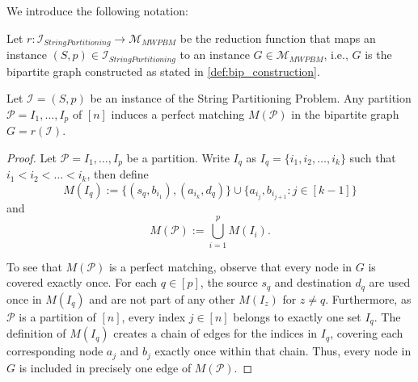 \runsdef*

\stringpartitioningdef*

We introduce the following notation:
\begin{definition}
    Let $r:\mathcal{I}_{String Partitioning} \rightarrow \mathcal{M}_{MWPBM}$ be the reduction function that maps an instance $(S, p)\in \mathcal{I}_{String Partitioning}$ to an instance $G\in\mathcal{M}_{MWPBM}$, i.e., $G$ is the bipartite graph constructed as stated in \cref{def:bip_construction}.
\end{definition}

\begin{lemma} \label{lemma:partition_induces_matching}
    Let $\mathcal{I}=(S, p)$ be an instance of the String Partitioning Problem. Any partition $\mathcal{P}=I_1,\dots,I_p$ of $[n]$ induces a perfect matching $M(\mathcal{P})$ in the bipartite graph $G = r(\mathcal{I})$.
\end{lemma}
\begin{proof}
    Let $\mathcal{P}=I_1,\dots,I_p$ be a partition. Write $I_q$ as $I_q = \{i_1, i_2, \dots, i_k\}$ such that $i_1 <i_2<\dots<i_k$, then define 
    $$
        M(I_q) := \{(s_q, b_{i_1}), (a_{i_k}, d_q)\} \cup \{a_{i_j}, b_{i_{j+1}} : j \in [k-1]\}
    $$
    and 
    $$
        M(\mathcal{P}) := \bigcup_{i=1}^p M(I_i).
    $$
    
    To see that $M(\mathcal{P})$ is a perfect matching, observe that every node in $G$ is covered exactly once. For each $q \in [p]$, the source $s_q$ and destination $d_q$ are used once in $M(I_q)$ and are not part of any other $M(I_z)$ for $z \neq q$. Furthermore, as $\mathcal{P}$ is a partition of $[n]$, every index $j \in [n]$ belongs to exactly one set $I_q$. The definition of $M(I_q)$ creates a chain of edges for the indices in $I_q$, covering each corresponding node $a_j$ and $b_j$ exactly once within that chain. Thus, every node in $G$ is included in precisely one edge of $M(\mathcal{P})$.
\end{proof}

